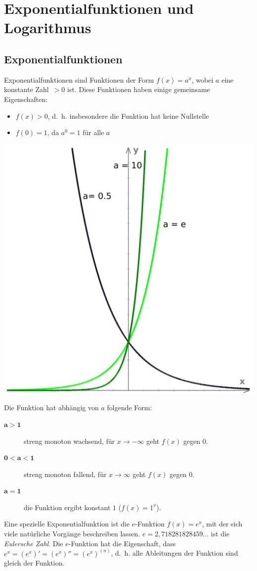 \section{Exponentialfunktionen und Logarithmus}\label{sec:exponential}

\subsection{Exponentialfunktionen}
Exponentialfunktionen sind Funktionen der Form $f(x) = a^x$, wobei $a$ eine
konstante Zahl~$>0$ ist. Diese Funktionen haben einige gemeinsame
Eigenschaften:
\begin{itemize}
 \item $f(x) > 0$, d.~h. insbesondere die Funktion hat keine Nullstelle
 \item $f(0) = 1$, da $a^0 = 1$ für alle $a$
\end{itemize}

\begin{center}
\includegraphics[width=.4\textwidth]{img/exp.pdf} 
\end{center}

\noindent Die Funktion hat abhängig von $a$ folgende Form:
\begin{description}
 \item[$\mathbf{a > 1}$] streng monoton wachsend, für $x \rightarrow -\infty$
geht $f(x)$ gegen $0$.
 \item[$\mathbf{0 < a < 1}$] streng monoton fallend, für $x \rightarrow
\infty$ geht $f(x)$ gegen $0$.
 \item[$\mathbf{a = 1}$] die Funktion ergibt konstant $1$ ($f(x) = 1^x$).
\end{description}

\noindent Eine spezielle Exponentialfunktion ist die $e$-Funktion $f(x) = e^x$, mit 
der sich viele natürliche Vorgänge beschreiben lassen. $e =
2,718281828459\dots$ ist die \emph{Eulersche Zahl}. Die $e$-Funktion hat die
Eigenschaft, dass $e^x = (e^x)' = (e^x)'' = (e^x)^{(n)}$, d.~h. alle Ableitungen der
Funktion sind gleich der Funktion.

